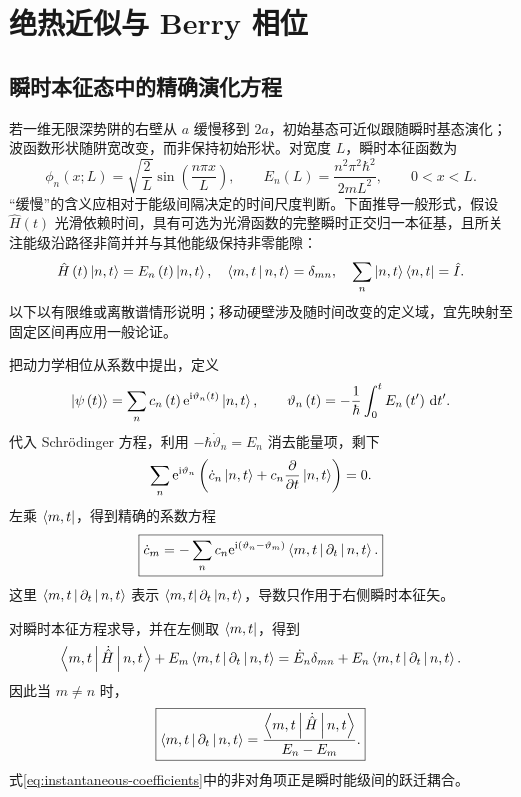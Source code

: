 \section{绝热近似与 Berry 相位}
\subsection{瞬时本征态中的精确演化方程}
若一维无限深势阱的右壁从 $a$ 缓慢移到 $2a$，初始基态可近似跟随瞬时基态演化；波函数形状随阱宽改变，而非保持初始形状。对宽度 $L$，瞬时本征函数为
\begin{equation}
\phi_n\left(x;L\right)=\sqrt{\frac2L}\sin\left(\frac{n\pi x}{L}\right),\qquad
E_n\left(L\right)=\frac{n^2\pi^2\hbar^2}{2mL^2},\qquad 0<x<L.
\end{equation}
“缓慢”的含义应相对于能级间隔决定的时间尺度判断。下面推导一般形式，假设 $\hat H\left(t\right)$ 光滑依赖时间，具有可选为光滑函数的完整瞬时正交归一本征基，且所关注能级沿路径非简并并与其他能级保持非零能隙：
\begin{equation}
\hat H\left(t\right)\Ket{n,t}=E_n\left(t\right)\Ket{n,t},\quad
\Braket{m,t|n,t}=\delta_{mn},\quad\sum_n\Ket{n,t}\Bra{n,t}=\hat I.
\end{equation}
以下以有限维或离散谱情形说明；移动硬壁涉及随时间改变的定义域，宜先映射至固定区间再应用一般论证。

把动力学相位从系数中提出，定义
\begin{equation}
\Ket{\psi\left(t\right)}=\sum_n c_n\left(t\right)
\mathrm{e}^{\mathrm{i}\vartheta_n\left(t\right)}\Ket{n,t},\qquad
\vartheta_n\left(t\right)=-\frac1\hbar\int_0^t E_n\left(t'\right)\,\mathrm{d}t'.
\end{equation}
代入 Schr\"odinger 方程，利用 $-\hbar\dot\vartheta_n=E_n$ 消去能量项，剩下
\begin{equation}
\sum_n\mathrm{e}^{\mathrm{i}\vartheta_n}
\left(\dot c_n\Ket{n,t}+c_n\frac{\partial}{\partial t}\Ket{n,t}\right)=0.
\end{equation}
左乘 $\Bra{m,t}$，得到精确的系数方程
\begin{equation}
\boxed{\dot c_m=-\sum_n c_n\mathrm{e}^{\mathrm{i}\left(\vartheta_n-\vartheta_m\right)}
\Braket{m,t|\partial_t|n,t}.}
\label{eq:instantaneous-coefficients}
\end{equation}
这里 $\Braket{m,t|\partial_t|n,t}$ 表示 $\Bra{m,t}\partial_t\Ket{n,t}$，导数只作用于右侧瞬时本征矢。

对瞬时本征方程求导，并在左侧取 $\Bra{m,t}$，得到
\begin{equation}
\Braket{m,t|\dot{\hat H}|n,t}+E_m\Braket{m,t|\partial_t|n,t}
=\dot E_n\delta_{mn}+E_n\Braket{m,t|\partial_t|n,t}.
\end{equation}
因此当 $m\neq n$ 时，
\begin{equation}
\boxed{\Braket{m,t|\partial_t|n,t}
=\frac{\Braket{m,t|\dot{\hat H}|n,t}}{E_n-E_m}.}
\label{eq:offdiagonal-adiabatic-coupling}
\end{equation}
式\eqref{eq:instantaneous-coefficients}中的非对角项正是瞬时能级间的跃迁耦合。

